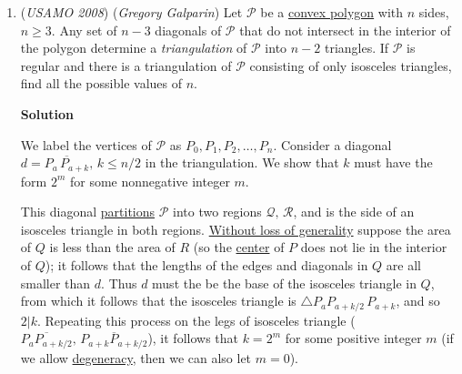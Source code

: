 \begin{enumerate}
 


 <i>Alternate solutions are always welcome. If you have a different, elegant solution to this problem, please \href{https://artofproblemsolving.com/wiki/index.php?title=2008\_USAMO\_Problems/Problem\_3&action=edit}{add it} to this page.</i>



	\item (\textit{USAMO 2008}) (\textit{Gregory Galparin}) Let $\mathcal{P}$ be a \href{https://artofproblemsolving.com/wiki/index.php?title=Convex\_polygon}{convex polygon} with $n$ sides, $n\ge3$. Any set of $n-3$ diagonals of $\mathcal{P}$ that do not intersect in the interior of the polygon determine a \textit{triangulation} of $\mathcal{P}$ into $n - 2$ triangles. If $\mathcal{P}$ is regular and there is a triangulation of $\mathcal{P}$ consisting of only isosceles triangles, find all the possible values of $n$.


 



\textbf{Solution}

We label the vertices of $\mathcal{P}$ as $P_0, P_1, P_2, \ldots, P_n$. Consider a diagonal $d = \overline{P_a\,P_{a+k}},\,k \le n/2$ in the triangulation. We show that $k$ must have the form $2^{m}$ for some nonnegative integer $m$.

 This diagonal \href{https://artofproblemsolving.com/wiki/index.php?title=Partition}{partitions} $\mathcal{P}$ into two regions $\mathcal{Q},\, \mathcal{R}$, and is the side of an isosceles triangle in both regions. \href{https://artofproblemsolving.com/wiki/index.php?title=Without\_loss\_of\_generality}{Without loss of generality} suppose the area of $Q$ is less than the area of $R$ (so the \href{https://artofproblemsolving.com/wiki/index.php?title=Circumcenter}{center} of $P$ does not lie in the interior of $Q$); it follows that the lengths of the edges and diagonals in $Q$ are all smaller than $d$. Thus $d$ must the be the base of the isosceles triangle in $Q$, from which it follows that the isosceles triangle is $\triangle P_aP_{a+k/2}\,P_{a+k}$, and so $2|k$. Repeating this process on the legs of isosceles triangle ($\overline{P_aP_{a+k/2}},\,\overline{P_{a+k}P_{a+k/2}}$), it follows that $k = 2^m$ for some positive integer $m$ (if we allow \href{https://artofproblemsolving.com/wiki/index.php?title=Degenerate}{degeneracy}, then we can also let $m=0$). 


\end{enumerate}
